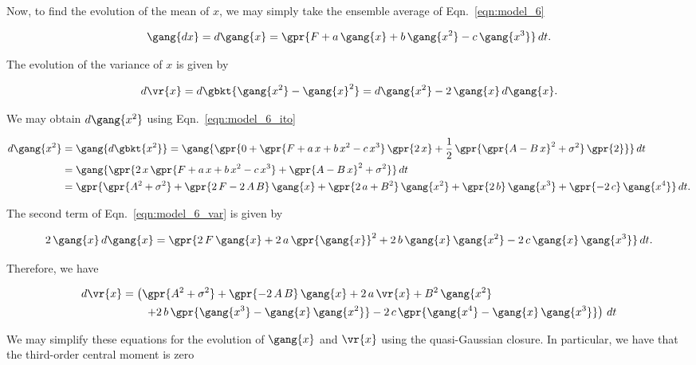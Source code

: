 \begin{enumerate}[a)]
	Now, to find the evolution of the mean of $x$, we may simply take the ensemble average of Eqn.~\ref{eqn:model_6}
	
	\begin{equation}
		\gang{dx} = d\gang{x} = \gpr{F + a\,\gang{x} + b\,\gang{x^2} - c\,\gang{x^3}}\,dt.
	\end{equation}
	
	The evolution of the variance of $x$ is given by 
	
	\begin{equation}
		d\vr{x} = d\gbkt{\gang{x^2} - \gang{x}^2} = d\gang{x^2} - 2\,\gang{x}\,d\gang{x}.
		\label{eqn:model_6_var}
	\end{equation}
	
	We may obtain $d\gang{x^2}$ using Eqn.~\ref{eqn:model_6_ito}
	
	\begin{align}
		d \gang{x^2} &= \gang{d \gbkt{x^2}} = \gang{\gpr{0 + \gpr{F + a\,x + b\,x^2 - c\,x^3}\,\gpr{2\,x} + \frac{1}{2}\,\gpr{\gpr{A - B\,x}^2 + \sigma^2}\,\gpr{2}}}\,dt \nonumber \\
				&= \gang{\gpr{2\,x\,\gpr{F + a\,x + b\,x^2 - c\,x^3} + \gpr{A - B\,x}^2 + \sigma^2}}\,dt \nonumber \\
				&= \gpr{\gpr{A^2 + \sigma^2} + \gpr{2\,F - 2\,A\,B}\,\gang{x} + \gpr{2\,a + B^2}\,\gang{x^2} + \gpr{2\,b}\,\gang{x^3} + \gpr{-2\,c}\,\gang{x^4}}\,dt.
	\end{align}
	
	The second term of Eqn.~\ref{eqn:model_6_var} is given by
	
	\begin{equation}
		2\,\gang{x}\,d\gang{x} = \gpr{2\,F\,\gang{x} + 2\,a\,\gpr{\gang{x}}^2 + 2\,b\,\gang{x}\,\gang{x^2} - 2\,c\,\gang{x}\,\gang{x^3}}\,dt.
	\end{equation}
	
	Therefore, we have
	
	\begin{align}
		d\vr{x} &= \left(\gpr{A^2 + \sigma^2} + \gpr{-2\,A\,B}\,\gang{x} + 2\,a\,\vr{x} + B^2\,\gang{x^2} \right. \nonumber \\
				&\qquad \left. + 2\,b\,\gpr{\gang{x^3} - \gang{x}\,\gang{x^2}} - 2\,c\,\gpr{\gang{x^4} - \gang{x}\,\gang{x^3}} \right)\,dt
	\end{align}
	
	We may simplify these equations for the evolution of $\gang{x}$ and $\vr{x}$ using the quasi-Gaussian closure. In particular, we have that the third-order central moment is zero
	

\end{enumerate}
